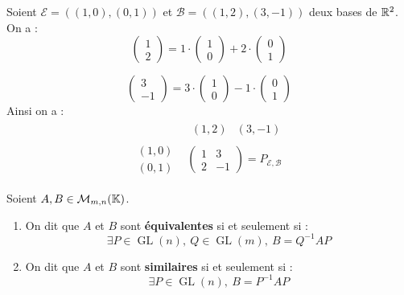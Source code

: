 \begin{example}
	Soient $\mathcal{E} = ((1, 0), (0, 1))$ et $\mathcal{B} = ((1, 2), (3, -1))$ deux bases de $\mathbb{R}^2$.
	On a :
	\[
	\begin{pmatrix}
		1 \\
		2
	\end{pmatrix}
	= 
	1 \cdot
	\begin{pmatrix}
		1 \\
		0
	\end{pmatrix}
	+ 2 \cdot
	\begin{pmatrix}
		0 \\
		1
	\end{pmatrix}
	\]
	
	\[
	\begin{pmatrix}
		3 \\
		-1
	\end{pmatrix}
	=
	3 \cdot
	\begin{pmatrix}
		1 \\
		0
	\end{pmatrix}
	- 1 \cdot 
	\begin{pmatrix}
		0 \\
		1
	\end{pmatrix}
	\]
	Ainsi on a :
	\begin{align*}
		&\begin{matrix}
			(1, 2) & (3, -1)
		\end{matrix}
		\\
		\begin{matrix}
			(1, 0) \\
			(0, 1)
		\end{matrix}
		&\begin{pmatrix}
			1 & 3 \\
			2 & -1
		\end{pmatrix} = P_{\mathcal{E},\mathcal{B}}
	\end{align*}
\end{example}

\begin{definition}
    Soient $A, B \in \mathcal{M}_{m,n}(\mathbb{K})$.
    \begin{enumerate}
        \item On dit que $A$ et $B$ sont \textbf{équivalentes} si et seulement si : 
        \[ \exists P \in \operatorname{GL}(n),\ Q \in \operatorname{GL}(m),\ B = Q^{-1} A P \]
        \item On dit que $A$ et $B$ sont \textbf{similaires} si et seulement si :
        \[ \exists P \in \operatorname{GL}(n),\ B = P^{-1} A P \]
    \end{enumerate}
\end{definition}

